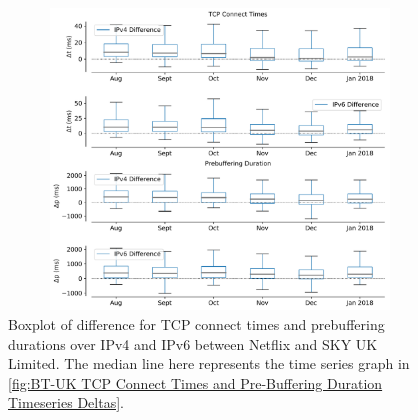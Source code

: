 \begin{figure}[!ht]
	\centering
	\includegraphics[keepaspectratio, height=8cm, width=15cm]{figures/cache/btuk/netflix-tcp-pd-delay-boxplot-asn-2856.pdf}
	\caption[BT-UK TCP Connect Times and Pre-Buffering Duration Boxplot Deltas]{Boxplot of difference for TCP connect times and prebuffering durations over IPv4 and IPv6 between Netflix and SKY UK Limited.
	The median line here represents the time series graph in \cref{fig:BT-UK TCP Connect Times and Pre-Buffering Duration Timeseries Deltas}.}
	\label{fig:BT-UK TCP Connect Times and Pre-Buffering Duration Boxplot Deltas}
\end{figure}

